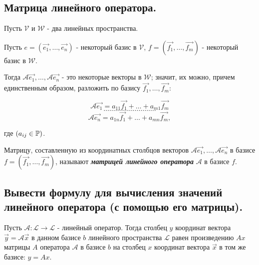 \newpage


\subsection{
    Матрица линейного оператора.
}

Пусть $\mathcal{V}$ и $\mathcal{W}$ - два линейных пространства.

Пусть $e = (\vec{e_1}, \ldots, \vec{e_n})$ - некоторый базис в $\mathcal{V}$, $f = (\vec{f_1}, \ldots, \vec{f_m})$ - некоторый базис в $\mathcal{W}$. 

Тогда $\mathscr{A}\vec{e_1}, \ldots, \mathscr{A}\vec{e_n}$ - это некоторые векторы в $\mathcal{W}$; значит, их можно, причем единственным образом, разложить по базису $\vec{f_1}, \ldots, \vec{f_m}$:

$$\mathscr{A}\vec{e_1} = a_{11}\vec{f_1} + \ldots + a_{m1}\vec{f_m}$$
$$\ldots \ldots \ldots \ldots \ldots \ldots \ldots \ldots \ldots$$
$$\mathscr{A}\vec{e_n} = a_{1n}\vec{f_1} + \ldots + a_{mn}\vec{f_m},$$

где $(a_{ij} \in \mathbb{P})$.

\begin{definition}
    Матрицу, составленную из координатных столбцов векторов $\mathscr{A}\vec{e_1}, \ldots, \mathscr{A}\vec{e_n}$ в базисе $f = (\vec{f_1}, \ldots, \vec{f_m})$, называют \textit{\textbf{матрицей линейного оператора}} $\mathscr{A}$ в базисе $f$.
\end{definition}


\newpage


\subsection{
    Вывести формулу для вычисления значений 
    линейного оператора (с помощью его 
    матрицы).
}

\begin{theorem}
    Пусть $\mathscr{A} \colon \mathcal{L} \to \mathcal{L}$ - линейный оператор. Тогда столбец $y$ координат вектора $\vec{y} = \mathscr{A}\vec{x}$ в данном базисе $b$ линейного пространства $\mathcal{L}$ равен произведению $Ax$ матрицы $A$ оператора $\mathscr{A}$ в базисе $b$ на столбец $x$ координат вектора $\vec{x}$ в том же базисе: $y = Ax$.
    \label{thm:theorem_21_1}
\end{theorem}

